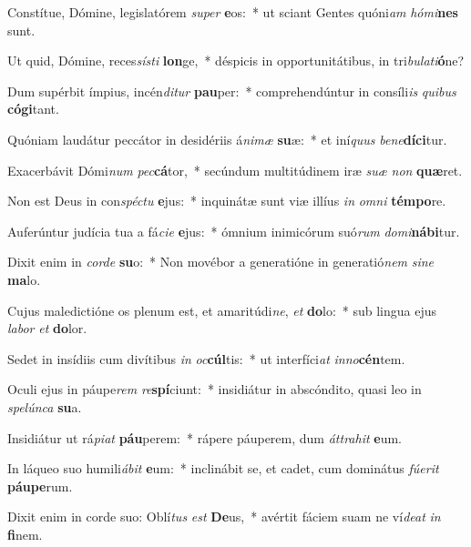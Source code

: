 \item Constítue, Dómine, legislatórem \textit{su}\textit{per} \textbf{e}os:~* ut sciant Gentes quóni\textit{am} \textit{hó}\textit{mi}\textbf{nes} sunt.
\item Ut quid, Dómine, reces\textit{sís}\textit{ti} \textbf{lon}ge,~* déspicis in opportunitátibus, in tri\textit{bu}\textit{la}\textit{ti}\textbf{ó}ne?
\item Dum supérbit ímpius, incén\textit{di}\textit{tur} \textbf{pau}per:~* comprehendúntur in consíli\textit{is} \textit{qui}\textit{bus} \textbf{có}\textbf{gi}tant.
\item Quóniam laudátur peccátor in desidériis á\textit{ni}\textit{mæ} \textbf{su}æ:~* et iní\textit{quus} \textit{be}\textit{ne}\textbf{dí}\textbf{ci}tur.
\item Exacerbávit Dómi\textit{num} \textit{pec}\textbf{cá}tor,~* secúndum multitúdinem iræ \textit{su}\textit{æ} \textit{non} \textbf{quæ}ret.
\item Non est Deus in con\textit{spéc}\textit{tu} \textbf{e}jus:~* inquinátæ sunt viæ illíus \textit{in} \textit{om}\textit{ni} \textbf{tém}\textbf{po}re.
\item Auferúntur judícia tua a fá\textit{ci}\textit{e} \textbf{e}jus:~* ómnium inimicórum suó\textit{rum} \textit{do}\textit{mi}\textbf{ná}\textbf{bi}tur.
\item Dixit enim in \textit{cor}\textit{de} \textbf{su}o:~* Non movébor a generatióne in generatió\textit{nem} \textit{si}\textit{ne} \textbf{ma}lo.
\item Cujus maledictióne os plenum est, et amaritúdi\textit{ne}, \textit{et} \textbf{do}lo:~* sub lingua ejus \textit{la}\textit{bor} \textit{et} \textbf{do}lor.
\item Sedet in insídiis cum divítibus \textit{in} \textit{oc}\textbf{cúl}tis:~* ut interfíci\textit{at} \textit{in}\textit{no}\textbf{cén}tem.
\item Oculi ejus in páupe\textit{rem} \textit{re}\textbf{spí}ciunt:~* insidiátur in abscóndito, quasi leo in \textit{spe}\textit{lún}\textit{ca} \textbf{su}a.
\item Insidiátur ut rá\textit{pi}\textit{at} \textbf{páu}perem:~* rápere páuperem, dum \textit{át}\textit{tra}\textit{hit} \textbf{e}um.
\item In láqueo suo humili\textit{á}\textit{bit} \textbf{e}um:~* inclinábit se, et cadet, cum dominátus \textit{fú}\textit{e}\textit{rit} \textbf{páu}\textbf{pe}rum.
\item Dixit enim in corde suo: Oblí\textit{tus} \textit{est} \textbf{De}us,~* avértit fáciem suam ne ví\textit{de}\textit{at} \textit{in} \textbf{fi}nem.
